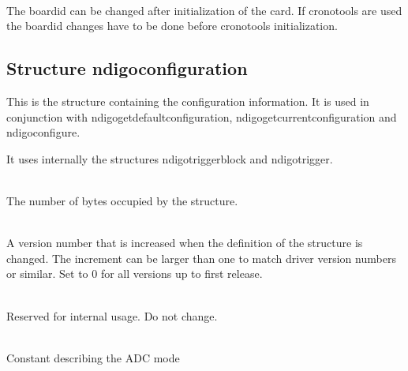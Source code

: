 		 \\
		The \textsf{board\tu id} can be changed after initialization of the card. If cronotools are used the \textsf{board\tu id} changes have to be done before cronotools initialization.	
	
		\subsection{Structure ndigo\tu configuration}
		
			This is the structure containing the configuration information. It is used in conjunction with \textsf{ndigo\tu get\tu default\tu configuration}, \textsf{ndigo\tu get\tu current\tu configuration} and \textsf{ndigo\tu configure}.\par

			It uses internally the structures \textsf{ndigo\tu trigger\tu block} and \textsf{ndigo\tu trigger}.\par

			\\
			The number of bytes occupied by the structure.\par

			\\
			A version number that is increased when the definition of the structure is changed. The increment can be larger than one to match driver version numbers or similar. Set to 0 for all versions up to first release.\par

			\\
			Reserved for internal usage. Do not change.\par

			\\
			Constant describing the ADC mode\par


